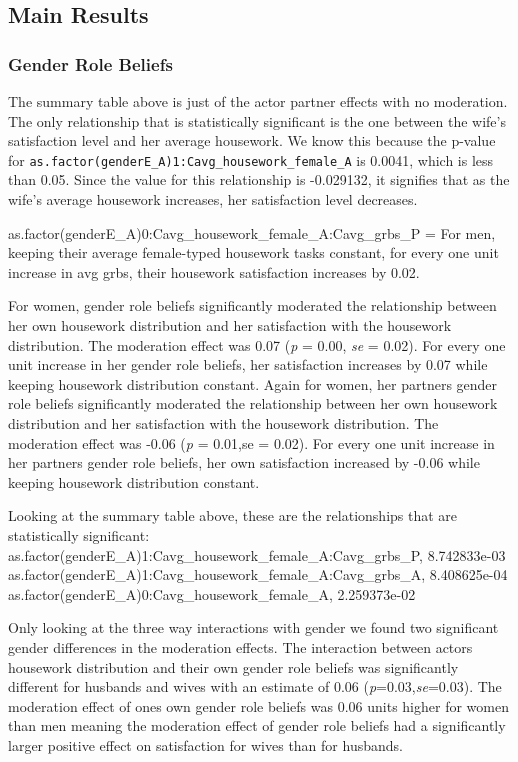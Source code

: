 \documentclass[
  english,
  man,floatsintext]{apa6}
\begin{document}
\hypertarget{main-results}{%
\subsection{Main Results}\label{main-results}}

\hypertarget{gender-role-beliefs}{%
\subsubsection{Gender Role Beliefs}\label{gender-role-beliefs}}

The summary table above is just of the actor partner effects with no moderation. The only relationship that is statistically significant is the one between the wife's satisfaction level and her average housework. We know this because the p-value for \texttt{as.factor(genderE\_A)1:Cavg\_housework\_female\_A} is 0.0041, which is less than 0.05. Since the value for this relationship is -0.029132, it signifies that as the wife's average housework increases, her satisfaction level decreases.

as.factor(genderE\_A)0:Cavg\_housework\_female\_A:Cavg\_grbs\_P = For men, keeping their average female-typed housework tasks constant, for every one unit increase in avg grbs, their housework satisfaction increases by 0.02.

For women, gender role beliefs significantly moderated the relationship between her own housework distribution and her satisfaction with the housework distribution. The moderation effect was 0.07 (\emph{p} = 0.00, \emph{se} = 0.02). For every one unit increase in her gender role beliefs, her satisfaction increases by 0.07 while keeping housework distribution constant. Again for women, her partners gender role beliefs significantly moderated the relationship between her own housework distribution and her satisfaction with the housework distribution. The moderation effect was -0.06 (\emph{p} = 0.01,se = 0.02). For every one unit increase in her partners gender role beliefs, her own satisfaction increased by -0.06 while keeping housework distribution constant.

Looking at the summary table above, these are the relationships that are statistically significant:
as.factor(genderE\_A)1:Cavg\_housework\_female\_A:Cavg\_grbs\_P, 8.742833e-03
as.factor(genderE\_A)1:Cavg\_housework\_female\_A:Cavg\_grbs\_A, 8.408625e-04
as.factor(genderE\_A)0:Cavg\_housework\_female\_A, 2.259373e-02

Only looking at the three way interactions with gender we found two significant gender differences in the moderation effects. The interaction between actors housework distribution and their own gender role beliefs was significantly different for husbands and wives with an estimate of 0.06 (\emph{p}=0.03,\emph{se}=0.03). The moderation effect of ones own gender role beliefs was 0.06 units higher for women than men meaning the moderation effect of gender role beliefs had a significantly larger positive effect on satisfaction for wives than for husbands.
\end{document}
